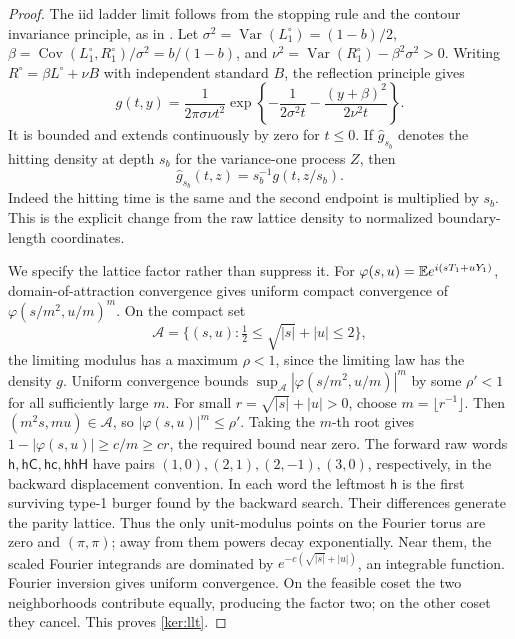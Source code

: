 \begin{proof}
The iid ladder limit follows from the stopping rule and the contour
invariance principle, as in \cite[Section~2.1]{GwynneSunFKII}.
Let \(\sigma^2=\operatorname{Var}(L_1^\circ)=(1-b)/2\),
\(\beta=\operatorname{Cov}(L_1^\circ,R_1^\circ)/\sigma^2=b/(1-b)\),
and \(\nu^2=\operatorname{Var}(R_1^\circ)-\beta^2\sigma^2>0\).
Writing \(R^\circ=\beta L^\circ+\nu B\) with independent standard
\(B\), the
reflection principle gives
\begin{equation}
 g(t,y)=\frac{1}{2\pi\sigma\nu t^2}
  \exp\!\left\{-\frac{1}{2\sigma^2t}
              -\frac{(y+\beta)^2}{2\nu^2t}\right\}.
 \label{ker:hit-density}
\end{equation}
It is bounded and extends continuously by zero for \(t\le0\).
If \(\widehat g_{s_b}\) denotes the hitting density at depth \(s_b\)
for the variance-one process \(Z\), then
\begin{equation}\label{ker:hitting-units}
 \widehat g_{s_b}(t,z)=s_b^{-1}g(t,z/s_b).
\end{equation}
Indeed the hitting time is the same and the second endpoint is
multiplied by \(s_b\).  This is the explicit change from the raw
lattice density to normalized boundary-length coordinates.

We specify the lattice factor rather than suppress it.
For \(\varphi(s,u)=\mathbb E e^{i(sT_1+uY_1)}\), domain-of-attraction
convergence gives uniform compact convergence of
\(\varphi(s/m^2,u/m)^m\).
On the compact set
\[
 \mathcal A=\{(s,u):\tfrac12\le\sqrt{|s|}+|u|\le2\},
\]
the limiting modulus has a maximum \(\rho<1\), since the limiting
law has the density \(g\).  Uniform convergence bounds
\(\sup_{\mathcal A}|\varphi(s/m^2,u/m)|^m\) by some
\(\rho'<1\) for all sufficiently large \(m\).
For small \(r=\sqrt{|s|}+|u|>0\), choose \(m=\lfloor r^{-1}\rfloor\).
Then \((m^2s,mu)\in\mathcal A\), so
\(|\varphi(s,u)|^m\le\rho'\).  Taking the \(m\)-th root gives
\(1-|\varphi(s,u)|\ge c/m\ge cr\), the required bound near zero.
The forward raw words
\(\mathsf h,\mathsf h\mathsf C,\mathsf h\mathsf c,
\mathsf h\mathsf h\mathsf H\)
have pairs \((1,0),(2,1),(2,-1),(3,0)\), respectively, in the
backward displacement convention.  In each word the leftmost
\(\mathsf h\) is the first surviving type-1 burger found by the
backward search.
Their differences generate the parity lattice.  Thus the only
unit-modulus points on the Fourier torus are zero and \((\pi,\pi)\);
away from them powers decay exponentially.  Near them, the scaled
Fourier integrands are dominated by
\(e^{-c(\sqrt{|s|}+|u|)}\), an integrable function.
Fourier inversion gives uniform convergence.  On the feasible coset
the two neighborhoods contribute equally, producing the factor two;
on the other coset they cancel.  This proves \eqref{ker:llt}.


\end{proof}
